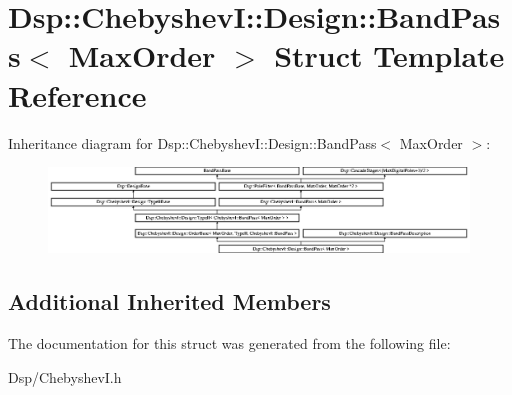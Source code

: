 \hypertarget{structDsp_1_1ChebyshevI_1_1Design_1_1BandPass}{\section{Dsp\-:\-:Chebyshev\-I\-:\-:Design\-:\-:Band\-Pass$<$ Max\-Order $>$ Struct Template Reference}
\label{structDsp_1_1ChebyshevI_1_1Design_1_1BandPass}
}
Inheritance diagram for Dsp\-:\-:Chebyshev\-I\-:\-:Design\-:\-:Band\-Pass$<$ Max\-Order $>$\-:\begin{figure}[H]
\begin{center}
\leavevmode
\includegraphics[height=2.281059cm]{structDsp_1_1ChebyshevI_1_1Design_1_1BandPass}
\end{center}
\end{figure}
\subsection*{Additional Inherited Members}


The documentation for this struct was generated from the following file\-:\begin{DoxyCompactItemize}
\item 
Dsp/Chebyshev\-I.\-h\end{DoxyCompactItemize}
